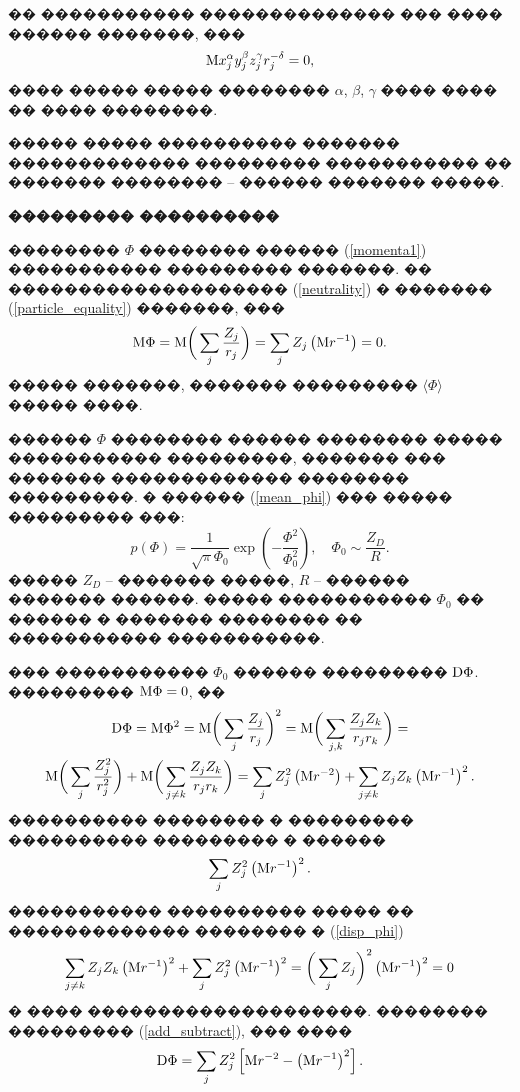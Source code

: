 \documentclass[12pt,titlepage]{article}
\newcommand\M{{\rm M}} %
\newcommand\D{{\rm D}}
\begin{document}
�� ����������� �������������� ��� ���� ������ �������, ���
\begin{equation}
    \label{simmetry}
    {\rm M} x_j^\alpha y_j^{\beta} z_j^{\gamma} r_j^{-\delta} = 0,
\end{equation}
���� ����� ����� �������� $\alpha$, $\beta$, $\gamma$ ���� ���� �� ���� ��������.

����� ����� ���������� ������� ������������� ��������� ����������� �� ������� �������� -- ������ ������� �����.

\bigskip
\textbf{��������� ����������}

�������� $\Phi$ �������� ������ (\ref{momenta1}) ����������� ��������� �������. �� �������������������� (\ref{neutrality}) � ������� (\ref{particle_equality}) �������, ���
\begin{equation}
    \label{mean_phi}
    \M \Phi = \M \bigg( \sum_j \frac{Z_j}{r_j} \bigg) = \sum_j Z_j \left( \M r^{-1} \right) = 0.
\end{equation}
����� �������, ������� ��������� $\langle \Phi \rangle$ ����� ����.

������ $\Phi$ �������� ������ �������� ����� ����������� ���������, ������� ��� ������� ������������� �������� ���������. � ������ (\ref{mean_phi}) ��� ����� ��������� ���:
\begin{equation}
    \label{distrib_Phi}
    p(\Phi) = \frac{1}{\sqrt{\pi}\Phi_0}\exp\left(-\frac{\Phi^2}{\Phi_0^2}\right), \quad \Phi_0 \sim \frac{Z_D}{R}.
\end{equation}
����� $Z_D$ -- ������� �����, $R$ -- ������ ������� ������. ����� ����������� $\Phi_0$ �� ������ � ������� �������� �� ����������� �����������.

��� ����������� $\Phi_0$ ������ ��������� $\D\Phi$. ��������� $\M \Phi = 0$, ��
\begin{gather}
    \D \Phi = \M \Phi^2 = \M \bigg( \sum_j \frac{Z_j}{r_j} \bigg)^2 = \M \bigg( \sum_{j,k} \frac{Z_j Z_k}{r_j r_k} \bigg) = \notag \\
    \label{disp_phi}
    \M \bigg( \sum_{j} \frac{Z_j^2}{r_j^2} \bigg) + \M \bigg( \sum_{j \not= k} \frac{Z_j Z_k}{r_j r_k} \bigg)
    = \sum_j Z_j^2 \left( \M r^{-2} \right)  +  \sum_{j \not= k} Z_j Z_k \left( {\rm M} r^{-1} \right)^2.
\end{gather}
���������� �������� � ��������� ���������� ��������� � ������
\begin{equation}
    \label{add_subtract}
    \sum_j Z_j^2 \left( \M r^{-1}\right)^2.
\end{equation}
����������� ���������� ����� �� ������������� �������� � (\ref{disp_phi})
\begin{equation*}
    \sum_{j \not= k} Z_j Z_k \left( \M r^{-1} \right)^2 + \sum_j Z_j^2 \left( \M r^{-1} \right)^2 = \bigg( \sum_j Z_j \bigg)^2 \left( \M r^{-1} \right)^2 = 0
\end{equation*}
� ���� ��������������������. �������� ��������� (\ref{add_subtract}), ��� ����
\begin{equation}
    \label{disp_phi_final}
    {\rm D} \Phi = \sum_j Z_j^2 \left[ {\rm M} r^{-2} - \left({\rm M} r^{-1}\right)^2 \right].
\end{equation}
\end{document}
